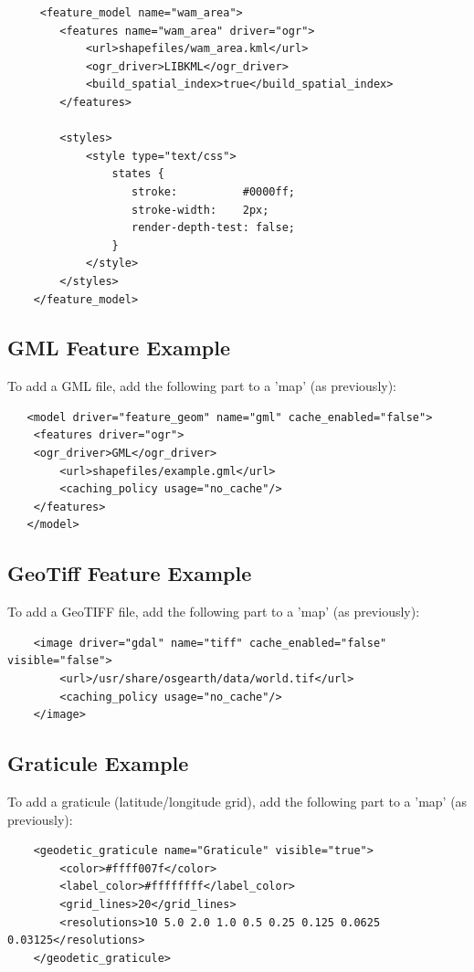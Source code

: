 \begin{lstlisting}
     <feature_model name="wam_area">
        <features name="wam_area" driver="ogr">
            <url>shapefiles/wam_area.kml</url>
            <ogr_driver>LIBKML</ogr_driver>
            <build_spatial_index>true</build_spatial_index>
        </features>        

        <styles>
            <style type="text/css">
                states {
                   stroke:          #0000ff; 
                   stroke-width:    2px;
                   render-depth-test: false;
                }                    
            </style>
        </styles>        
    </feature_model>
\end{lstlisting}

\subsection{GML Feature Example}

To add a GML file, add the following part to a 'map' (as previously):

\begin{lstlisting}
   <model driver="feature_geom" name="gml" cache_enabled="false">
    <features driver="ogr">
	<ogr_driver>GML</ogr_driver>
        <url>shapefiles/example.gml</url>
        <caching_policy usage="no_cache"/>
    </features>
   </model>
\end{lstlisting}

\subsection{GeoTiff Feature Example}

To add a GeoTIFF file, add the following part to a 'map' (as previously):

\begin{lstlisting}
    <image driver="gdal" name="tiff" cache_enabled="false" visible="false">
        <url>/usr/share/osgearth/data/world.tif</url>
        <caching_policy usage="no_cache"/>
    </image>
\end{lstlisting}

\subsection{Graticule Example}

To add a graticule (latitude/longitude grid), add the following part to a 'map' (as previously):

\begin{lstlisting}
    <geodetic_graticule name="Graticule" visible="true">
        <color>#ffff007f</color>
        <label_color>#ffffffff</label_color>
        <grid_lines>20</grid_lines>
        <resolutions>10 5.0 2.0 1.0 0.5 0.25 0.125 0.0625 0.03125</resolutions>
    </geodetic_graticule>
\end{lstlisting}
\ \\

